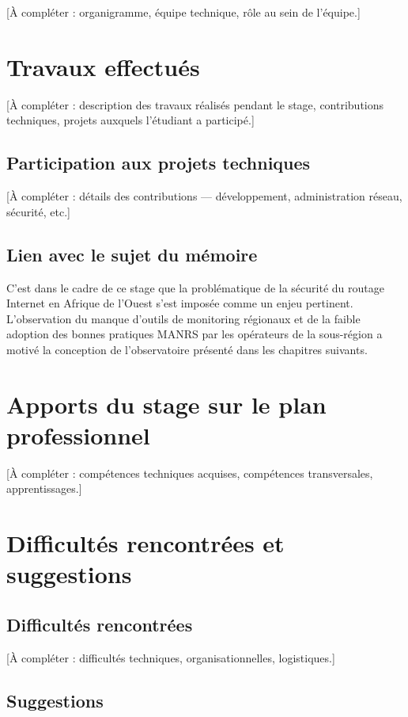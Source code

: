 \documentclass{eneam}
\begin{document}
[À compléter : organigramme, équipe technique, rôle au sein de l'équipe.]

\section{Travaux effectués}

[À compléter : description des travaux réalisés pendant le stage, contributions techniques, projets auxquels l'étudiant a participé.]

\subsection{Participation aux projets techniques}

[À compléter : détails des contributions --- développement, administration réseau, sécurité, etc.]

\subsection{Lien avec le sujet du mémoire}

C'est dans le cadre de ce stage que la problématique de la sécurité du routage Internet en Afrique de l'Ouest s'est imposée comme un enjeu pertinent. L'observation du manque d'outils de monitoring régionaux et de la faible adoption des bonnes pratiques MANRS par les opérateurs de la sous-région a motivé la conception de l'observatoire présenté dans les chapitres suivants.

\section{Apports du stage sur le plan professionnel}

[À compléter : compétences techniques acquises, compétences transversales, apprentissages.]

\section{Difficultés rencontrées et suggestions}

\subsection{Difficultés rencontrées}

[À compléter : difficultés techniques, organisationnelles, logistiques.]

\subsection{Suggestions}
\end{document}
